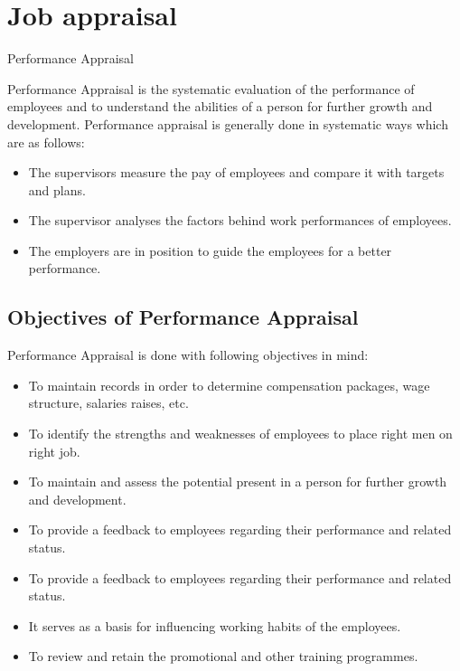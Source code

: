\documentclass[]{book}
\providecommand{\tightlist}{%
  \setlength{\itemsep}{0pt}\setlength{\parskip}{0pt}}
\begin{document}
\hypertarget{job-appraisal}{%
\section{Job appraisal}\label{job-appraisal}}

Performance Appraisal

Performance Appraisal is the systematic evaluation of the performance of employees and to understand the abilities of a person for further growth and development. Performance appraisal is generally done in systematic ways which are as follows:

\begin{itemize}
\tightlist
\item
  The supervisors measure the pay of employees and compare it with targets and plans.
\item
  The supervisor analyses the factors behind work performances of employees.
\item
  The employers are in position to guide the employees for a better performance.
\end{itemize}

\hypertarget{objectives-of-performance-appraisal}{%
\subsection{Objectives of Performance Appraisal}\label{objectives-of-performance-appraisal}}

Performance Appraisal is done with following objectives in mind:

\begin{itemize}
\tightlist
\item
  To maintain records in order to determine compensation packages, wage structure, salaries raises, etc.
\item
  To identify the strengths and weaknesses of employees to place right men on right job.
\item
  To maintain and assess the potential present in a person for further growth and development.
\item
  To provide a feedback to employees regarding their performance and related status.
\item
  To provide a feedback to employees regarding their performance and related status.
\item
  It serves as a basis for influencing working habits of the employees.
\item
  To review and retain the promotional and other training programmes.
\end{itemize}
\end{document}
